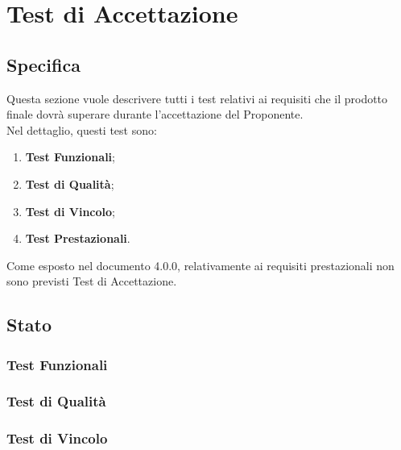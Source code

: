 \section{Test di Accettazione}

	\subsection{Specifica}
		Questa sezione vuole descrivere tutti i test relativi ai requisiti che il prodotto finale dovrà superare durante l'accettazione del Proponente.\\
		Nel dettaglio, questi test sono:
		\begin{enumerate}
			\item \textbf{Test Funzionali};
			\item \textbf{Test di Qualità};
			\item \textbf{Test di Vincolo};
			\item \textbf{Test Prestazionali}.
		\end{enumerate}
		Come esposto nel documento \AdR{} 4.0.0, relativamente ai requisiti prestazionali non sono previsti Test di Accettazione. \\
	
	\subsection{Stato}
	
		\subsubsection{Test Funzionali}
			
			\pagebreak
		\subsubsection{Test di Qualità}
			
			\pagebreak
		\subsubsection{Test di Vincolo}
			